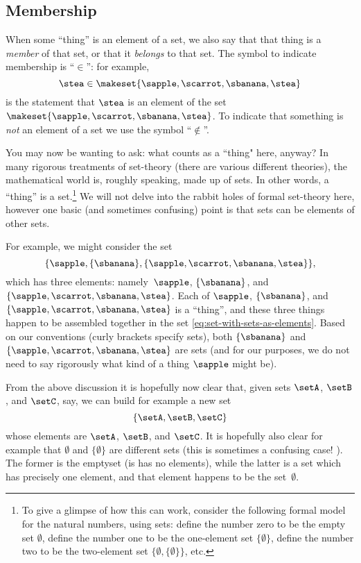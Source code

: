\subsection{Membership}

When some ``thing'' is an element of a set, we also say that that thing is a \emph{member} of that set, or that it \emph{belongs} to that set.
The symbol to indicate membership is ``$\in$'': for example,
\begin{equation}
    \stea \in \makeset{ \sapple, \scarrot, \sbanana, \stea }
\end{equation}
is the statement that $\stea$ is an element of the set~$\makeset{ \sapple, \scarrot, \sbanana, \stea }$.
To indicate that something is \emph{not} an element of a set we use the symbol ``$\notin$''.


You may now be wanting to ask: what counts as a ``thing" here, anyway? In many rigorous treatments of set-theory (there are various different theories), the mathematical world is, roughly speaking, made up of sets.
In other words, a ``thing'' is a set.\footnote{To give a glimpse of how this can work, consider the following formal model for the natural numbers, using sets: define the number zero to be the empty set $\emptyset$, define the number one to be the one-element set $\{ \emptyset \}$, define the number two to be the two-element set $\{ \emptyset, \{ \emptyset \} \}$, etc. }
We will not delve into the rabbit holes of formal set-theory here, however one basic (and sometimes confusing) point is that sets can be elements of other sets.

For example, we might consider the set
%
\begin{equation}\label{eq:set-with-sets-as-elements}
    \{ \sapple, \{ \sbanana \}, \{ \sapple, \scarrot, \sbanana, \stea \} \},
\end{equation}
%
which has three elements: namely~$\sapple$, $\{ \sbanana \}$, and~$\{ \sapple, \scarrot, \sbanana, \stea \}$.
Each of $\sapple$, $\{ \sbanana \}$, and~$\{ \sapple, \scarrot, \sbanana, \stea \}$ is a ``thing'', and these three things happen to be assembled together in the set \cref{eq:set-with-sets-as-elements}.
Based on our conventions (curly brackets specify sets), both $\{ \sbanana \}$ and~$\{ \sapple, \scarrot, \sbanana, \stea \}$ are sets (and for our purposes, we do not need to say rigorously what kind of a thing $\sapple$ might be).

From the above discussion it is hopefully now clear that, given sets $\setA$, $\setB$, and $\setC$, say, we can build for example a new set
\begin{equation}
    \{ \setA, \setB, \setC \}
\end{equation}
whose elements are $\setA$, $\setB$, and $\setC$.
It is hopefully also clear for example that $\emptyset$ and $\{ \emptyset \}$ are different sets (this is sometimes a confusing case!
).
The former is the emptyset (is has no elements), while the latter is a set which has precisely one element, and that element happens to be the set~$\emptyset$.

